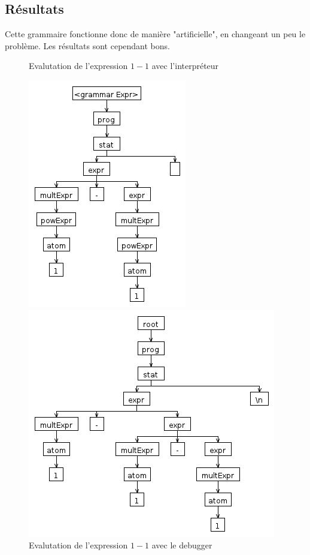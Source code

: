 \documentclass[11pt,a4paper]{article}
\begin{document}
		\subsection{Résultats}
Cette grammaire fonctionne donc de manière "artificielle", en changeant un peu le problème. Les résultats sont cependant bons. \\
\begin{figure}[h!]
\begin{minipage}[b]{0.5\linewidth}\centering
\caption{Evalutation de l'expression $1-1$ avec l'interpréteur}
\includegraphics[scale=0.5]{figures/arbre_v2_interpreter.jpg}
\end{minipage}
\hspace{0.5cm}
\begin{minipage}{0.5\linewidth}\centering
\caption{Evalutation de l'expression $1-1$ avec le debugger}
\includegraphics[scale=0.5]{figures/arbre_v2_debugger.jpg}
\end{minipage}
\end{figure}
\end{document}
